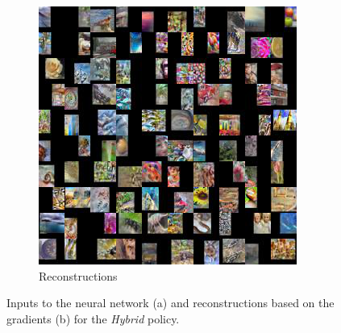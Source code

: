 \begin{figure}[hbt!]
\begin{subfigure}{.49\linewidth}
\includegraphics[width=\textwidth]{grids/data_cifar100_arch_ResNet20-4_epoch_200_optim_inversed_mode_aug_auglist_3-1-7+43-18-18_rlabel_False_reaugment_translate_clipped3_RECONSTRUCTIONS.png}
\caption{Reconstructions}%
\end{subfigure}%
\caption{Inputs to the neural network (a) and reconstructions based on the gradients (b) for the \textit{Hybrid} policy.}
    \label{fig:apprr7}
\end{figure}

